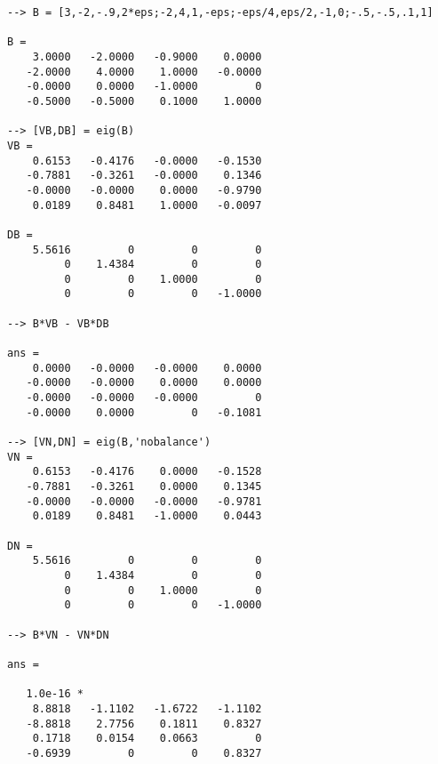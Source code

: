 \begin{verbatim}
--> B = [3,-2,-.9,2*eps;-2,4,1,-eps;-eps/4,eps/2,-1,0;-.5,-.5,.1,1]

B = 
    3.0000   -2.0000   -0.9000    0.0000 
   -2.0000    4.0000    1.0000   -0.0000 
   -0.0000    0.0000   -1.0000         0 
   -0.5000   -0.5000    0.1000    1.0000 

--> [VB,DB] = eig(B)
VB = 
    0.6153   -0.4176   -0.0000   -0.1530 
   -0.7881   -0.3261   -0.0000    0.1346 
   -0.0000   -0.0000    0.0000   -0.9790 
    0.0189    0.8481    1.0000   -0.0097 

DB = 
    5.5616         0         0         0 
         0    1.4384         0         0 
         0         0    1.0000         0 
         0         0         0   -1.0000 

--> B*VB - VB*DB

ans = 
    0.0000   -0.0000   -0.0000    0.0000 
   -0.0000   -0.0000    0.0000    0.0000 
   -0.0000   -0.0000   -0.0000         0 
   -0.0000    0.0000         0   -0.1081 

--> [VN,DN] = eig(B,'nobalance')
VN = 
    0.6153   -0.4176    0.0000   -0.1528 
   -0.7881   -0.3261    0.0000    0.1345 
   -0.0000   -0.0000   -0.0000   -0.9781 
    0.0189    0.8481   -1.0000    0.0443 

DN = 
    5.5616         0         0         0 
         0    1.4384         0         0 
         0         0    1.0000         0 
         0         0         0   -1.0000 

--> B*VN - VN*DN

ans = 

   1.0e-16 * 
    8.8818   -1.1102   -1.6722   -1.1102 
   -8.8818    2.7756    0.1811    0.8327 
    0.1718    0.0154    0.0663         0 
   -0.6939         0         0    0.8327 
\end{verbatim}
